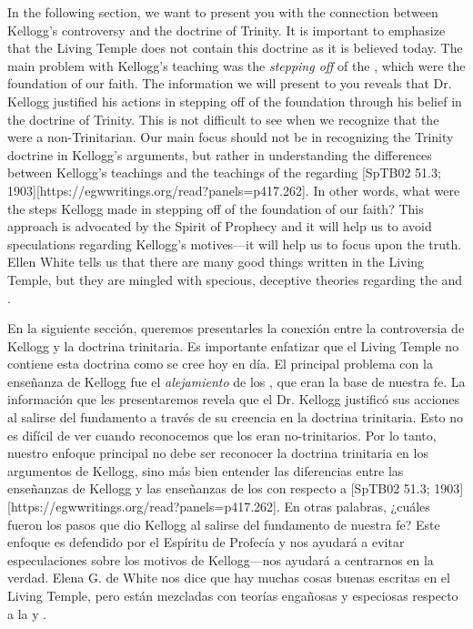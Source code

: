 In the following section, we want to present you with the connection between Kellogg’s controversy and the doctrine of Trinity. It is important to emphasize that the Living Temple does not contain this doctrine as it is believed today. The main problem with Kellogg’s teaching was the \textit{stepping off} of the , which were the foundation of our faith. The information we will present to you reveals that Dr. Kellogg justified his actions in stepping off of the foundation through his belief in the doctrine of Trinity. This is not difficult to see when we recognize that the  were a non-Trinitarian. Our main focus should not be in recognizing the Trinity doctrine in Kellogg's arguments, but rather in understanding the differences between Kellogg’s teachings and the teachings of the  regarding [SpTB02 51.3; 1903][https://egwwritings.org/read?panels=p417.262]. In other words, what were the steps Kellogg made in stepping off of the foundation of our faith? This approach is advocated by the Spirit of Prophecy and it will help us to avoid speculations regarding Kellogg’s motives—it will help us to focus upon the truth. Ellen White tells us that there are many good things written in the Living Temple, but they are mingled with specious, deceptive theories regarding the  and .


En la siguiente sección, queremos presentarles la conexión entre la controversia de Kellogg y la doctrina trinitaria. Es importante enfatizar que el Living Temple no contiene esta doctrina como se cree hoy en día. El principal problema con la enseñanza de Kellogg fue el \textit{alejamiento} de los , que eran la base de nuestra fe. La información que les presentaremos revela que el Dr. Kellogg justificó sus acciones al salirse del fundamento a través de su creencia en la doctrina trinitaria. Esto no es difícil de ver cuando reconocemos que los  eran no-trinitarios. Por lo tanto, nuestro enfoque principal no debe ser reconocer la doctrina trinitaria en los argumentos de Kellogg, sino más bien entender las diferencias entre las enseñanzas de Kellogg y las enseñanzas de los  con respecto a [SpTB02 51.3; 1903][https://egwwritings.org/read?panels=p417.262]. En otras palabras, ¿cuáles fueron los pasos que dio Kellogg al salirse del fundamento de nuestra fe? Este enfoque es defendido por el Espíritu de Profecía y nos ayudará a evitar especulaciones sobre los motivos de Kellogg—nos ayudará a centrarnos en la verdad. Elena G. de White nos dice que hay muchas cosas buenas escritas en el Living Temple, pero están mezcladas con teorías engañosas y especiosas respecto a la  y .


